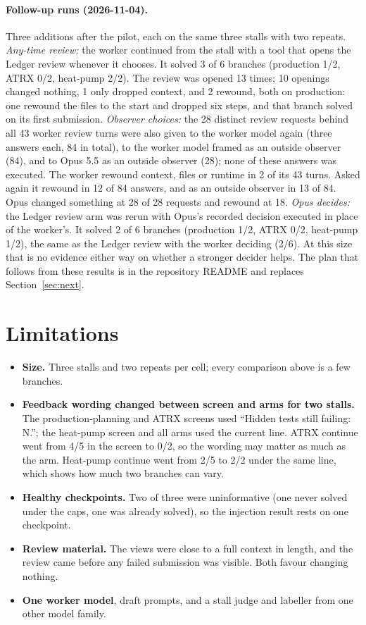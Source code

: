 \documentclass{article}
\begin{document}
\paragraph{Follow-up runs (2026-11-04).}
Three additions after the pilot, each on the same three stalls with two repeats. \emph{Any-time review:} the worker
continued from the stall with a tool that opens the Ledger review whenever it chooses. It solved 3 of 6 branches
(production 1/2, ATRX 0/2, heat-pump 2/2). The review was opened 13 times; 10 openings changed nothing, 1 only dropped
context, and 2 rewound, both on production: one rewound the files to the start and dropped six steps, and that branch
solved on its first submission. \emph{Observer choices:} the 28 distinct review requests behind all 43 worker review
turns were also given to the worker model again (three answers each, 84 in total), to the worker model framed as an
outside observer (84), and to Opus 5.5 as an outside observer (28); none of these answers was executed. The worker
rewound context, files or runtime in 2 of its 43 turns. Asked again it rewound in 12 of 84 answers, and as an outside
observer in 13 of 84. Opus changed something at 28 of 28 requests and rewound at 18. \emph{Opus decides:} the Ledger
review arm was rerun with Opus's recorded decision executed in place of the worker's. It solved 2 of 6 branches
(production 1/2, ATRX 0/2, heat-pump 1/2), the same as the Ledger review with the worker deciding (2/6). At this size
that is no evidence either way on whether a stronger decider helps. The plan that follows from these results is in
the repository README and replaces Section~\ref{sec:next}.

\section{Limitations}
\label{sec:limits}

\begin{itemize}[leftmargin=*,itemsep=1pt,topsep=2pt]
  \item \textbf{Size.} Three stalls and two repeats per cell; every comparison above is a few branches.
  \item \textbf{Feedback wording changed between screen and arms for two stalls.} The production-planning and ATRX
  screens used ``Hidden tests still failing: N.''; the heat-pump screen and all arms used the current line. ATRX
  continue went from 4/5 in the screen to 0/2, so the wording may matter as much as the arm. Heat-pump continue went
  from 2/5 to 2/2 under the same line, which shows how much two branches can vary.
  \item \textbf{Healthy checkpoints.} Two of three were uninformative (one never solved under the caps, one was already
  solved), so the injection result rests on one checkpoint.
  \item \textbf{Review material.} The views were close to a full context in length, and the review came before any
  failed submission was visible. Both favour changing nothing.
  \item \textbf{One worker model}, draft prompts, and a stall judge and labeller from one other model family.
\end{itemize}
\end{document}
